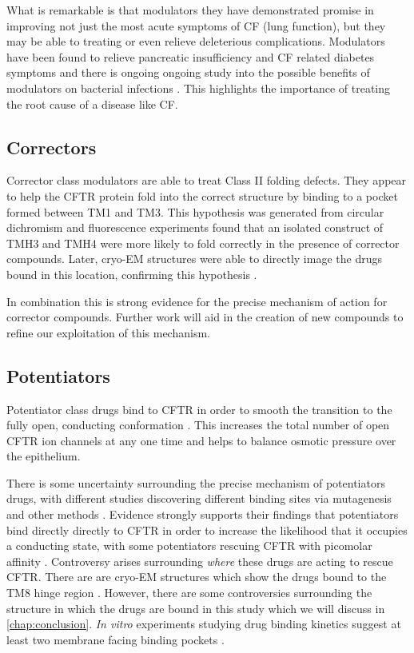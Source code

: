 What is remarkable is that modulators they have demonstrated promise in improving not just the most acute symptoms of CF (lung function), but they may be able to treating or even relieve deleterious complications. Modulators have been found to relieve pancreatic insufficiency and CF related diabetes symptoms \cite{gaines2021,lopes-pacheco2020, yi2021} and there is ongoing ongoing study into the possible benefits of modulators on bacterial infections \cite{harvey2022}. This highlights the importance of treating the root cause of a disease like CF.

\subsection{Correctors}
Corrector class modulators are able to treat Class II folding defects. They appear to help the CFTR protein fold into the correct structure by binding to a pocket formed between TM1 and TM3. This hypothesis was generated from circular dichromism \cite{greenfield2006} and fluorescence experiments found that an isolated construct of TMH3 and TMH4 were more likely to fold correctly in the presence of corrector compounds. Later, cryo-EM structures were able to directly image the drugs bound in this location, confirming this hypothesis \cite{fiedorczuk2022}. 

In combination this is strong evidence for the precise mechanism of action for corrector compounds. Further work will aid in the creation of new compounds to refine our exploitation of this mechanism.

\subsection{Potentiators}
Potentiator class drugs bind to CFTR in order to smooth the transition to the fully open, conducting conformation \cite{jih2013,yeh2017}. This increases the total number of open CFTR ion channels at any one time and helps to balance osmotic pressure over the epithelium.

There is some uncertainty surrounding the precise mechanism of potentiators drugs, with different studies discovering different binding sites via mutagenesis and other methods \cite{yeh2019, liu2019, laselva2021}. Evidence strongly supports their findings that potentiators bind directly directly to CFTR in order to increase the likelihood that it occupies a conducting state, with some potentiators rescuing CFTR with picomolar affinity \cite{csanady2019}. Controversy arises surrounding \textit{where} these drugs are acting to rescue CFTR. There are are cryo-EM structures which show the drugs bound to the TM8 hinge region \cite{liu2019}. However, there are some controversies surrounding the structure in which the drugs are bound in this study which we will discuss in \ref{chap:conclusion}. \textit {In vitro} experiments studying drug binding kinetics suggest at least two membrane facing binding pockets \cite{csanady2019}. 

